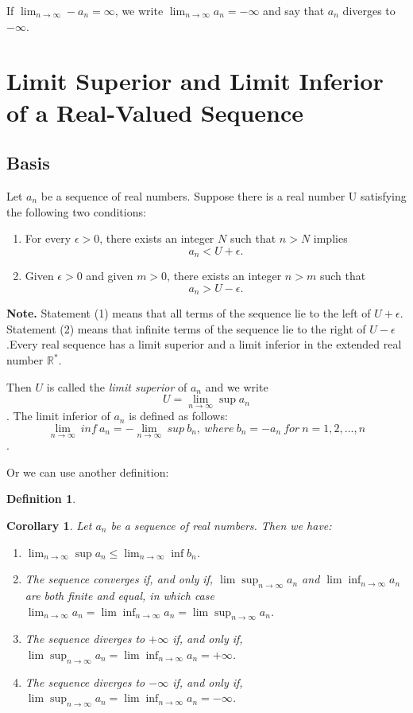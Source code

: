 \documentclass{article}
\newtheorem{corollary}[theorem]{Corollary}
\theoremstyle{definition}
\newtheorem{defi}{Definition}[section]
\begin{document}
If $\lim_{n\rightarrow\infty}-a_{n}=\infty$, we write $\lim_{n\rightarrow\infty}a_{n}=-\infty$ and say that $a_{n}$ 
diverges to $-\infty$. 

\section{Limit Superior and Limit Inferior of a Real-Valued Sequence}
\subsection{Basis}
Let ${a_{n}}$ be a sequence of real numbers. Suppose there is a real number U 
satisfying the following two conditions:

\begin{enumerate}
    \item For every $\epsilon > 0$, there exists an integer $N$ such that $n>N$ 
    implies $$a_{n}<U+\epsilon.$$
    \item Given $\epsilon>0$ and given $m>0$, there exists an integer $n>m$ such that 
    $$a_{n}>U-\epsilon.$$ 
\end{enumerate}

\textbf{Note.} Statement (1) means that all terms of the sequence lie to the left 
of $U+\epsilon$. Statement (2) means that infinite terms of the sequence lie to the 
right of $U-\epsilon$.Every real sequence has a limit superior and a limit inferior 
in the extended real number $\mathbb{R^{*}}$.

Then $U$ is called the \textit{limit superior} of ${a_{n}}$
and we write $$U=\lim_{n\rightarrow \infty}\sup{a_{n}}$$.
The limit inferior of ${a_{n}}$ is defined as follows:
$$\lim_{n\rightarrow \infty}\ inf\ a_{n}=-\lim_{n\rightarrow \infty}\ sup\ b_{n},\ where\ b_{n}=-a_{n}\ for\ n=1,2,...,n$$.

Or we can use another definition:
\begin{defi}


\end{defi}    






\begin{corollary}
Let $a_{n}$ be a sequence of real numbers. Then we have:
\begin{enumerate}
    \item $\lim_{n\rightarrow \infty}\sup a_{n}\leq\lim_{n\rightarrow \infty}\inf b_{n}$.
    \item The sequence converges if, and only if, $\lim\sup_{n\rightarrow \infty}a_{n}$ and 
    $\lim\inf_{n\rightarrow \infty}a_{n}$ are both finite and equal, in which case 
    $\lim_{n\rightarrow \infty}a_{n}=\lim\inf_{n\rightarrow \infty}a_{n}=\lim\sup_{n\rightarrow \infty}a_{n}$.
    \item The sequence diverges to $+\infty$ if, and only if, $\lim\sup_{n\rightarrow \infty}a_{n}=\lim\inf_{n\rightarrow \infty}a_{n}=+\infty$.
    \item The sequence diverges to $-\infty$ if, and only if, $\lim\sup_{n\rightarrow \infty}a_{n}=\lim\inf_{n\rightarrow \infty}a_{n}=-\infty$.
\end{enumerate}
\end{corollary}
\end{document}
